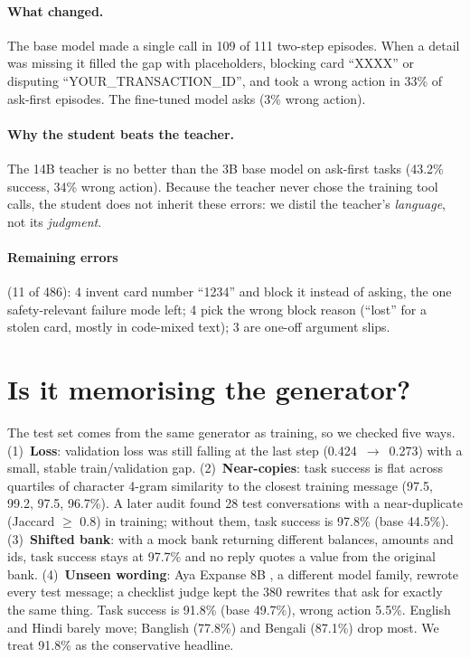 \documentclass[11pt]{article}
\begin{document}
\paragraph{What changed.} The base model made a single call in 109 of 111 two-step episodes. When a detail was
missing it filled the gap with placeholders, blocking card ``XXXX'' or disputing ``YOUR\_TRANSACTION\_ID'', and took
a wrong action in 33\% of ask-first episodes. The fine-tuned model asks (3\% wrong action).

\paragraph{Why the student beats the teacher.} The 14B teacher is no better than the 3B base model on ask-first
tasks (43.2\% success, 34\% wrong action). Because the teacher never chose the training tool calls, the student does
not inherit these errors: we distil the teacher's \emph{language}, not its \emph{judgment}.

\paragraph{Remaining errors} (11 of 486): 4 invent card number ``1234'' and block it instead of asking, the one
safety-relevant failure mode left; 4 pick the wrong block reason (``lost'' for a stolen card, mostly in code-mixed
text); 3 are one-off argument slips.

\section{Is it memorising the generator?}
\label{sec:robust}

The test set comes from the same generator as training, so we checked five ways.
(1)~\textbf{Loss}: validation loss was still falling at the last step (0.424~$\rightarrow$~0.273) with a small,
stable train/validation gap.
(2)~\textbf{Near-copies}: task success is flat across quartiles of character 4-gram similarity to the closest
training message (97.5, 99.2, 97.5, 96.7\%). A later audit found 28 test conversations with a near-duplicate
(Jaccard $\geq$ 0.8) in training; without them, task success is 97.8\% (base 44.5\%).
(3)~\textbf{Shifted bank}: with a mock bank returning different balances, amounts and ids, task success stays at
97.7\% and no reply quotes a value from the original bank.
(4)~\textbf{Unseen wording}: Aya Expanse 8B \citep{dang2024ayaexpanse}, a different model family, rewrote every test
message; a checklist judge kept the 380 rewrites that ask for exactly the same thing. Task success is 91.8\% (base
49.7\%), wrong action 5.5\%. English and Hindi barely move; Banglish (77.8\%) and Bengali (87.1\%) drop most. We treat
91.8\% as the conservative headline.
\end{document}
